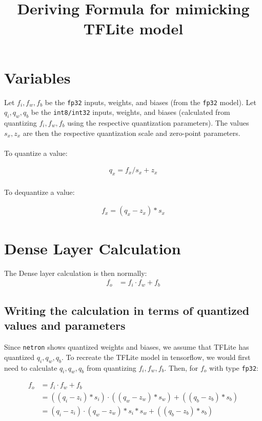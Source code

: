 \documentclass{article}
\title{Deriving Formula for mimicking TFLite model}
\date{}
\begin{document}
\maketitle

\section{Variables}

Let $f_i, f_w, f_b$ be the \verb|fp32| inputs, weights, and biases (from the \verb|fp32| model).
\linebreak
Let $q_i, q_w, q_b$ be the \verb|int8/int32| inputs, weights, and biases (calculated from quantizing $f_i, f_w, f_b$ using the respective quantization parameters). The values $s_x, z_x$ are then the respective quantization scale and zero-point parameters. \\ \\
To quantize a value:

\begin{equation} \label{eq1}
\begin{split}
q_x = f_x / s_x + z_x
\end{split}
\end{equation}
\\
To dequantize a value:

\begin{equation} \label{eq2}
\begin{split}
f_x = (q_x - z_x) * s_x
\end{split}
\end{equation}

\section{Dense Layer Calculation}

The Dense layer calculation is then normally:
\begin{equation} \label{eq3}
\begin{split}
f_o &= f_i \cdot f_w + f_b
\end{split}
\end{equation}

\subsection{Writing the calculation in terms of quantized values and parameters}

Since \verb|netron| shows quantized weights and biases, we assume that TFLite has quantized $q_i, q_w, q_b$. To recreate the TFLite model in tensorflow, we would first need to calculate  $q_i, q_w, q_b$ from quantizing $f_i, f_w, f_b$. Then, for $f_o$ with type \verb|fp32|:

\begin{equation} \label{eq4}
\begin{split}
f_o &= f_i \cdot f_w + f_b \\
 & = ((q_i-z_i)*s_i) \cdot ((q_w-z_w)*s_w) + ((q_b-z_b)*s_b)\\
 & = (q_i-z_i) \cdot (q_w-z_w)*s_i*s_w + ((q_b-z_b)*s_b)
\end{split}
\end{equation}
\end{document}
